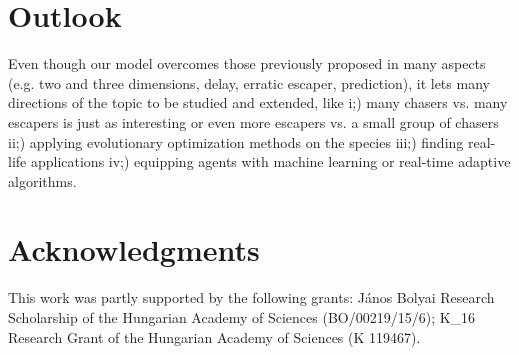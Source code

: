 \documentclass[12pt,a4paper,final]{iopart}
\begin{document}
\section{Outlook}

Even though our model overcomes those previously proposed in many aspects (e.g. two and three dimensions, delay, erratic escaper, prediction), it lets many directions of the topic to be studied and extended, like i;) many chasers vs. many escapers is just as interesting or even more escapers vs. a small group of chasers ii;) applying evolutionary optimization methods on the species iii;) finding real-life applications iv;) equipping agents with machine learning or real-time adaptive algorithms.






\section{Acknowledgments}

This work was partly supported by the following grants: J\'anos Bolyai Research Scholarship of the Hungarian Academy of Sciences (BO/00219/15/6); K\_16 Research Grant of the Hungarian Academy of Sciences (K 119467).










\end{document}
